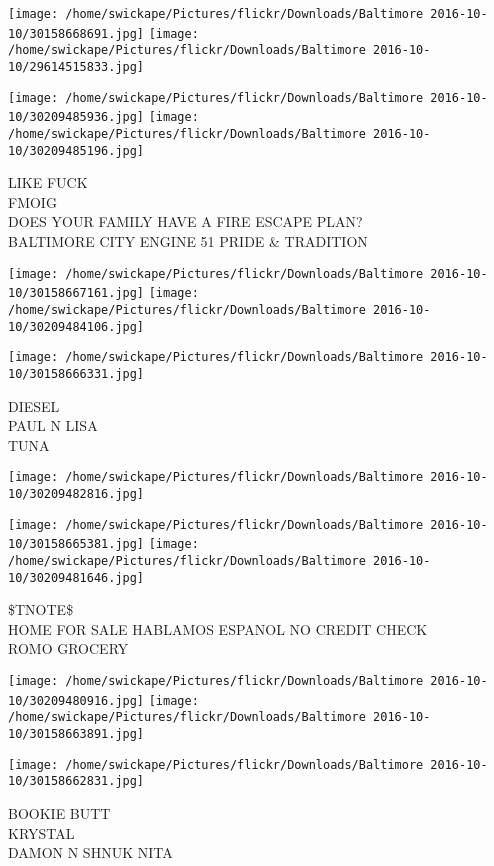 \documentclass[10pt,letterpaper]{article}
\begin{document}
\texttt{[image: /home/swickape/Pictures/flickr/Downloads/Baltimore 2016-10-10/30158668691.jpg]}
\texttt{[image: /home/swickape/Pictures/flickr/Downloads/Baltimore 2016-10-10/29614515833.jpg]}

\texttt{[image: /home/swickape/Pictures/flickr/Downloads/Baltimore 2016-10-10/30209485936.jpg]}
\texttt{[image: /home/swickape/Pictures/flickr/Downloads/Baltimore 2016-10-10/30209485196.jpg]}

LIKE FUCK\\
FMOIG\\
DOES YOUR FAMILY HAVE A FIRE ESCAPE PLAN?\\
BALTIMORE CITY ENGINE 51 PRIDE \& TRADITION
\pagebreak

\texttt{[image: /home/swickape/Pictures/flickr/Downloads/Baltimore 2016-10-10/30158667161.jpg]}
\texttt{[image: /home/swickape/Pictures/flickr/Downloads/Baltimore 2016-10-10/30209484106.jpg]}

\texttt{[image: /home/swickape/Pictures/flickr/Downloads/Baltimore 2016-10-10/30158666331.jpg]}

DIESEL\\
PAUL N LISA\\
TUNA
\pagebreak

\texttt{[image: /home/swickape/Pictures/flickr/Downloads/Baltimore 2016-10-10/30209482816.jpg]}

\vspace{0.25in}
\texttt{[image: /home/swickape/Pictures/flickr/Downloads/Baltimore 2016-10-10/30158665381.jpg]}
\texttt{[image: /home/swickape/Pictures/flickr/Downloads/Baltimore 2016-10-10/30209481646.jpg]}

\$TNOTE\$\\
HOME FOR SALE HABLAMOS ESPANOL NO CREDIT CHECK\\
ROMO GROCERY
\pagebreak

\texttt{[image: /home/swickape/Pictures/flickr/Downloads/Baltimore 2016-10-10/30209480916.jpg]}
\texttt{[image: /home/swickape/Pictures/flickr/Downloads/Baltimore 2016-10-10/30158663891.jpg]}

\vspace{0.25in}
\texttt{[image: /home/swickape/Pictures/flickr/Downloads/Baltimore 2016-10-10/30158662831.jpg]}

BOOKIE BUTT\\
KRYSTAL\\
DAMON N SHNUK NITA
\pagebreak
\end{document}
